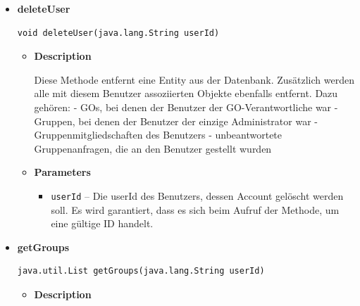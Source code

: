 \documentclass[11pt,a4paper]{article}
\begin{document}
{{{{{{{{{{{{\begin{itemize}
{\begin{itemize}
{Die Methode fügt eine neue UserEntity in die Datenbank ein.
}
\item{
{\bf  Parameters}
  \begin{itemize}
   \item{
\texttt{user} -- Die Entity, die in die Datenbank eingefügt werden soll. Dieses Objekt muss eine in der Datenbank noch nicht vorhandene ID enthalten, sonst schlägt die Ausführung fehl.}
  \end{itemize}
}%
\end{itemize}
}%
\item{ 
\hypertarget{edu.kit.pse17.go_app.PersistenceLayer.daos.UserDao.deleteUser(java.lang.String)}{{\bf  deleteUser}\\}
\begin{lstlisting}[frame=none]
void deleteUser(java.lang.String userId)\end{lstlisting} %
\begin{itemize}
\item{
{\bf  Description}

Diese Methode entfernt eine Entity aus der Datenbank. Zusätzlich werden alle mit diesem Benutzer assoziierten Objekte ebenfalls entfernt. Dazu gehören: - GOs, bei denen der Benutzer der GO-Verantwortliche war - Gruppen, bei denen der Benutzer der einzige Administrator war - Gruppenmitgliedschaften des Benutzers - unbeantwortete Gruppenanfragen, die an den Benutzer gestellt wurden
}
\item{
{\bf  Parameters}
  \begin{itemize}
   \item{
\texttt{userId} -- Die userId des Benutzers, dessen Account gelöscht werden soll. Es wird garantiert, dass es sich beim Aufruf der Methode, um eine gültige ID handelt.}
  \end{itemize}
}%
\end{itemize}
}%
\item{ 
\hypertarget{edu.kit.pse17.go_app.PersistenceLayer.daos.UserDao.getGroups(java.lang.String)}{{\bf  getGroups}\\}
\begin{lstlisting}[frame=none]
java.util.List getGroups(java.lang.String userId)\end{lstlisting} %
\begin{itemize}
\item{
{\bf  Description}

}
\end{itemize}}
\end{itemize}}}}}}}}}}}}}
\end{document}
